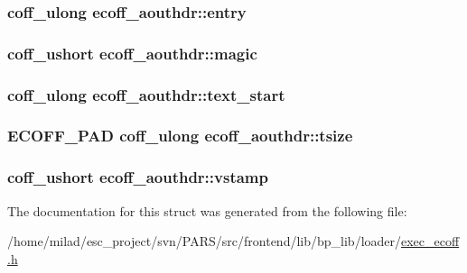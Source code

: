\label{structecoff__aouthdr_a0e6e28dad22a7a2117e0e326808e5e1c}
\hypertarget{structecoff__aouthdr_a82254009031278d45421007ae6995d4b}{
\subsubsection[{entry}]{\setlength{\rightskip}{0pt plus 5cm}coff\_\-ulong {\bf ecoff\_\-aouthdr::entry}}}
\label{structecoff__aouthdr_a82254009031278d45421007ae6995d4b}
\hypertarget{structecoff__aouthdr_a82d81eb0a575a4bfe6704dd6a39b0512}{
\subsubsection[{magic}]{\setlength{\rightskip}{0pt plus 5cm}coff\_\-ushort {\bf ecoff\_\-aouthdr::magic}}}
\label{structecoff__aouthdr_a82d81eb0a575a4bfe6704dd6a39b0512}
\hypertarget{structecoff__aouthdr_ab4f38b841b2fc8477d5622ba6210b029}{
\subsubsection[{text\_\-start}]{\setlength{\rightskip}{0pt plus 5cm}coff\_\-ulong {\bf ecoff\_\-aouthdr::text\_\-start}}}
\label{structecoff__aouthdr_ab4f38b841b2fc8477d5622ba6210b029}
\hypertarget{structecoff__aouthdr_a5d11e2f0b3845e3ff8b28ecafd7fab68}{
\subsubsection[{tsize}]{\setlength{\rightskip}{0pt plus 5cm}ECOFF\_\-PAD coff\_\-ulong {\bf ecoff\_\-aouthdr::tsize}}}
\label{structecoff__aouthdr_a5d11e2f0b3845e3ff8b28ecafd7fab68}
\hypertarget{structecoff__aouthdr_aef7b0a58b36a3252ef5bb2b840caee06}{
\subsubsection[{vstamp}]{\setlength{\rightskip}{0pt plus 5cm}coff\_\-ushort {\bf ecoff\_\-aouthdr::vstamp}}}
\label{structecoff__aouthdr_aef7b0a58b36a3252ef5bb2b840caee06}


The documentation for this struct was generated from the following file:\begin{DoxyCompactItemize}
\item 
/home/milad/esc\_\-project/svn/PARS/src/frontend/lib/bp\_\-lib/loader/\hyperlink{exec__ecoff_8h}{exec\_\-ecoff.h}\end{DoxyCompactItemize}

